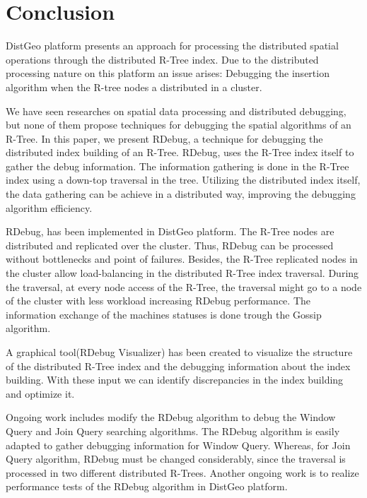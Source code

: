 \section{Conclusion}
\label{sec:conclusion}

DistGeo platform presents an approach for processing the distributed spatial operations through the distributed R-Tree index. Due to the distributed processing nature on this platform an issue arises: Debugging the insertion algorithm when the R-tree nodes a distributed in a cluster.

We have seen researches on spatial data processing and distributed debugging, but none of them propose techniques for debugging the spatial algorithms of an R-Tree. In this paper, we present RDebug, a technique for debugging the distributed index building of an R-Tree. RDebug, uses the R-Tree index itself to gather the debug information. The information gathering is done in the R-Tree index using a down-top traversal in the tree. Utilizing the distributed index itself, the data gathering can be achieve in a distributed way, improving the debugging algorithm efficiency.

RDebug, has been implemented in DistGeo platform. The R-Tree nodes are distributed and replicated over the cluster. Thus, RDebug can be processed without bottlenecks and point of failures. Besides, the R-Tree replicated nodes in the cluster allow load-balancing in the distributed R-Tree index traversal. During the traversal, at every node access of the R-Tree, the traversal might go to a node of the cluster with less workload increasing RDebug performance. The information exchange of the machines statuses is done trough the Gossip algorithm.

A graphical tool(RDebug Visualizer) has been created to visualize the structure of the distributed R-Tree index and the debugging information about the index building. With these input we can identify discrepancies in the index building and optimize it.

Ongoing work includes modify the RDebug algorithm to debug the Window Query and Join Query searching algorithms. The RDebug algorithm is easily adapted to gather debugging information for Window Query. Whereas, for Join Query algorithm, RDebug must be changed considerably, since the traversal is processed in two different distributed R-Trees. Another ongoing work is to realize performance tests of the RDebug algorithm in DistGeo platform.